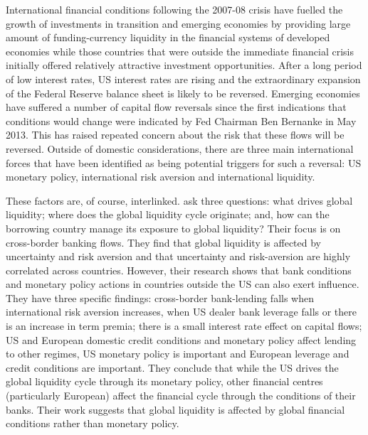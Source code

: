 \documentclass[12pt, a4paper, oneside]{article} %
\begin{document}

International financial conditions following the 2007-08 crisis have fuelled the growth of investments in transition and emerging economies by providing large amount of funding-currency liquidity in the financial systems of developed economies while those countries that were outside the immediate financial crisis initially offered relatively attractive investment opportunities.    After a long period of low interest rates, US interest rates are rising and the extraordinary expansion of the Federal Reserve balance sheet is likely to  be reversed. Emerging economies have suffered a number of capital flow reversals since the first indications that conditions would change were indicated by Fed Chairman Ben Bernanke in May 2013.  This has raised repeated concern about the risk that these flows will be reversed.  Outside of domestic considerations, there are three main international forces that have been identified as being potential triggers for such a reversal:  US monetary policy, international risk aversion and international liquidity. 

These factors are, of course, interlinked.  \citet{Cerutti2014} ask three questions:  what drives global liquidity; where does the global liquidity cycle originate; and, how can the borrowing country manage its exposure to global liquidity? Their focus is on cross-border banking flows. They find that global liquidity is affected by uncertainty and risk aversion and that uncertainty and risk-aversion are highly correlated across countries. However, their research shows that bank conditions and monetary policy actions in countries outside the US can also exert influence. They have three specific findings:  cross-border bank-lending falls when international risk aversion increases, when US dealer bank leverage falls or there is an increase in term premia; there is a small interest rate effect on capital flows; US and European domestic credit conditions and monetary policy affect lending to other regimes, US monetary policy is important and European leverage and credit conditions are important.  They conclude that while the US drives the global liquidity cycle through its monetary policy, other financial centres (particularly European) affect the financial cycle through the conditions of their banks. Their work suggests that global liquidity is affected by global financial conditions rather than monetary policy.
\end{document}
